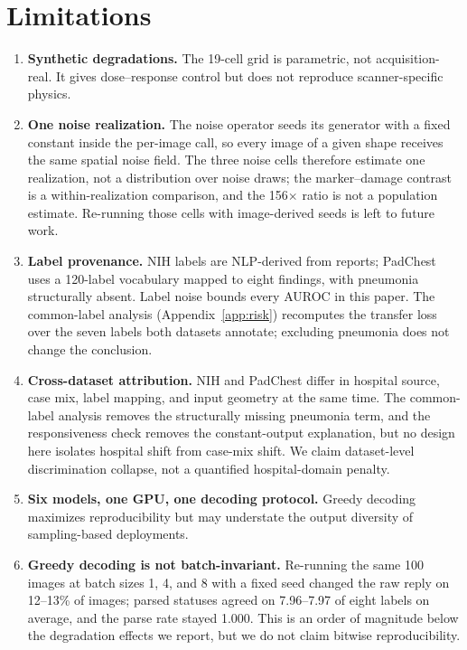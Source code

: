\section*{Limitations}
\label{sec:limitations}

\begin{enumerate}[leftmargin=1.2em,itemsep=2pt,topsep=2pt]
\item \textbf{Synthetic degradations.} The 19-cell grid is parametric, not acquisition-real. It gives dose--response control but does not reproduce scanner-specific physics.
\item \textbf{One noise realization.} The noise operator seeds its generator with a fixed constant inside the per-image call, so every image of a given shape receives the same spatial noise field. The three noise cells therefore estimate one realization, not a distribution over noise draws; the marker--damage contrast is a within-realization comparison, and the 156$\times$ ratio is not a population estimate. Re-running those cells with image-derived seeds is left to future work.
\item \textbf{Label provenance.} NIH labels are NLP-derived from reports; PadChest uses a 120-label vocabulary mapped to eight findings, with pneumonia structurally absent. Label noise bounds every AUROC in this paper. The common-label analysis (Appendix~\ref{app:risk}) recomputes the transfer loss over the seven labels both datasets annotate; excluding pneumonia does not change the conclusion.
\item \textbf{Cross-dataset attribution.} NIH and PadChest differ in hospital source, case mix, label mapping, and input geometry at the same time. The common-label analysis removes the structurally missing pneumonia term, and the responsiveness check removes the constant-output explanation, but no design here isolates hospital shift from case-mix shift. We claim dataset-level discrimination collapse, not a quantified hospital-domain penalty.
\item \textbf{Six models, one GPU, one decoding protocol.} Greedy decoding maximizes reproducibility but may understate the output diversity of sampling-based deployments.
\item \textbf{Greedy decoding is not batch-invariant.} Re-running the same 100 images at batch sizes 1, 4, and 8 with a fixed seed changed the raw reply on 12--13\% of images; parsed statuses agreed on 7.96--7.97 of eight labels on average, and the parse rate stayed 1.000. This is an order of magnitude below the degradation effects we report, but we do not claim bitwise reproducibility.

\end{enumerate}
